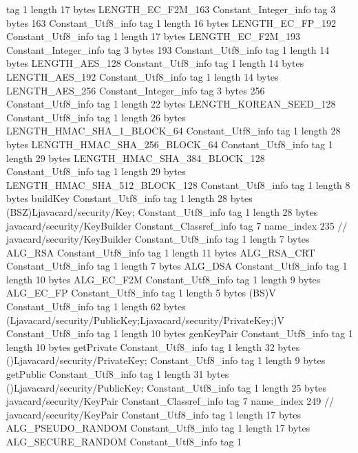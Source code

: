 {{{			tag	1
			length	17
			bytes	LENGTH_EC_F2M_163
		}
		Constant_Integer_info {
			tag	3
			bytes	163
		}
		Constant_Utf8_info {
			tag	1
			length	16
			bytes	LENGTH_EC_FP_192
		}
		Constant_Utf8_info {
			tag	1
			length	17
			bytes	LENGTH_EC_F2M_193
		}
		Constant_Integer_info {
			tag	3
			bytes	193
		}
		Constant_Utf8_info {
			tag	1
			length	14
			bytes	LENGTH_AES_128
		}
		Constant_Utf8_info {
			tag	1
			length	14
			bytes	LENGTH_AES_192
		}
		Constant_Utf8_info {
			tag	1
			length	14
			bytes	LENGTH_AES_256
		}
		Constant_Integer_info {
			tag	3
			bytes	256
		}
		Constant_Utf8_info {
			tag	1
			length	22
			bytes	LENGTH_KOREAN_SEED_128
		}
		Constant_Utf8_info {
			tag	1
			length	26
			bytes	LENGTH_HMAC_SHA_1_BLOCK_64
		}
		Constant_Utf8_info {
			tag	1
			length	28
			bytes	LENGTH_HMAC_SHA_256_BLOCK_64
		}
		Constant_Utf8_info {
			tag	1
			length	29
			bytes	LENGTH_HMAC_SHA_384_BLOCK_128
		}
		Constant_Utf8_info {
			tag	1
			length	29
			bytes	LENGTH_HMAC_SHA_512_BLOCK_128
		}
		Constant_Utf8_info {
			tag	1
			length	8
			bytes	buildKey
		}
		Constant_Utf8_info {
			tag	1
			length	28
			bytes	(BSZ)Ljavacard/security/Key;
		}
		Constant_Utf8_info {
			tag	1
			length	28
			bytes	javacard/security/KeyBuilder
		}
		Constant_Classref_info {
			tag	7
			name_index	235		// javacard/security/KeyBuilder
		}
		Constant_Utf8_info {
			tag	1
			length	7
			bytes	ALG_RSA
		}
		Constant_Utf8_info {
			tag	1
			length	11
			bytes	ALG_RSA_CRT
		}
		Constant_Utf8_info {
			tag	1
			length	7
			bytes	ALG_DSA
		}
		Constant_Utf8_info {
			tag	1
			length	10
			bytes	ALG_EC_F2M
		}
		Constant_Utf8_info {
			tag	1
			length	9
			bytes	ALG_EC_FP
		}
		Constant_Utf8_info {
			tag	1
			length	5
			bytes	(BS)V
		}
		Constant_Utf8_info {
			tag	1
			length	62
			bytes	(Ljavacard/security/PublicKey;Ljavacard/security/PrivateKey;)V
		}
		Constant_Utf8_info {
			tag	1
			length	10
			bytes	genKeyPair
		}
		Constant_Utf8_info {
			tag	1
			length	10
			bytes	getPrivate
		}
		Constant_Utf8_info {
			tag	1
			length	32
			bytes	()Ljavacard/security/PrivateKey;
		}
		Constant_Utf8_info {
			tag	1
			length	9
			bytes	getPublic
		}
		Constant_Utf8_info {
			tag	1
			length	31
			bytes	()Ljavacard/security/PublicKey;
		}
		Constant_Utf8_info {
			tag	1
			length	25
			bytes	javacard/security/KeyPair
		}
		Constant_Classref_info {
			tag	7
			name_index	249		// javacard/security/KeyPair
		}
		Constant_Utf8_info {
			tag	1
			length	17
			bytes	ALG_PSEUDO_RANDOM
		}
		Constant_Utf8_info {
			tag	1
			length	17
			bytes	ALG_SECURE_RANDOM
		}
		Constant_Utf8_info {
			tag	1
}}}
